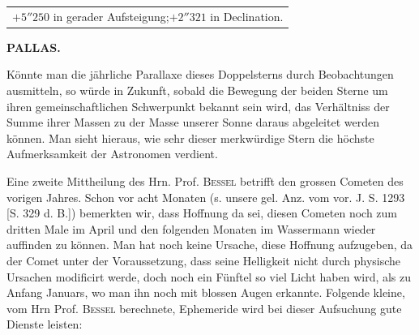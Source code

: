\begin{center}\fontsize{10}{12}\selectfont\setlength{\tabcolsep}{0pt}\renewcommand{\arraystretch}{1.15}\begin{tabular}{l}
$+5''250$ in gerader Aufsteigung;\quad $+2''321$ in Declination.
\end{tabular}\end{center}
\clearpage
\thispagestyle{empty}
\noindent{}%
\makebox[12mm][l]{}%
\parbox[t]{\dimexpr\linewidth-24mm\relax}{\centering\footnotesize\bfseries PALLAS.\par}%
\par\nobreak\medskip
\noindent Könnte man die jährliche Parallaxe dieses Doppelsterns durch Beobachtungen ausmitteln, so würde in Zukunft, sobald die Bewegung der beiden Sterne um ihren gemeinschaftlichen Schwerpunkt bekannt sein wird, das Verhältniss der Summe ihrer Massen zu der Masse unserer Sonne daraus abgeleitet werden können. Man sieht hieraus, wie sehr dieser merkwürdige Stern die höchste Aufmerksamkeit der Astronomen verdient.

\par\indent Eine zweite Mittheilung des Hrn. Prof. \textsc{Bessel} betrifft den grossen Cometen des vorigen Jahres. Schon vor acht Monaten (s. unsere gel. Anz. vom vor. J. S. 1293 [S. 329 d. B.]) bemerkten wir, dass Hoffnung da sei, diesen Cometen noch zum dritten Male im April und den folgenden Monaten im Wassermann wieder auffinden zu können. Man hat noch keine Ursache, diese Hoffnung aufzugeben, da der Comet unter der Voraussetzung, dass seine Helligkeit nicht durch physische Ursachen modificirt werde, doch noch ein Fünftel so viel Licht haben wird, als zu Anfang Januars, wo man ihn noch mit blossen Augen erkannte. Folgende kleine, vom Hrn Prof. \textsc{Bessel} berechnete, Ephemeride wird bei dieser Aufsuchung gute Dienste leisten:

